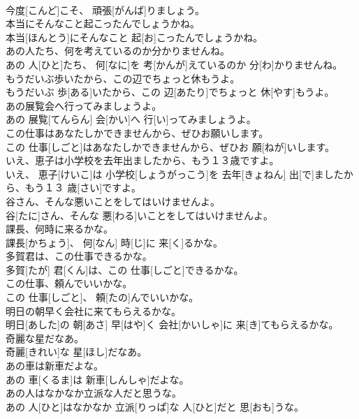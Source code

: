 \documentclass[8pt]{extreport}
\begin{document}
\begin{CJK}{UTF8}{min}
\\	今度[こんど]こそ、 頑張[がんば]りましょう。	
\\	本当にそんなこと起こったんでしょうかね。	
\\	本当[ほんとう]にそんなこと 起[お]こったんでしょうかね。	
\\	あの人たち、何を考えているのか分かりませんね。	
\\	あの 人[ひと]たち、 何[なに]を 考[かんが]えているのか 分[わ]かりませんね。	
\\	もうだいぶ歩いたから、この辺でちょっと休もうよ。	
\\	もうだいぶ 歩[ある]いたから、この 辺[あたり]でちょっと 休[やす]もうよ。	
\\	あの展覧会へ行ってみましょうよ。	
\\	あの 展覧[てんらん] 会[かい]へ 行[い]ってみましょうよ。	
\\	この仕事はあなたしかできませんから、ぜひお願いします。	
\\	この 仕事[しごと]はあなたしかできませんから、ぜひお 願[ねが]いします。	
\\	いえ、恵子は小学校を去年出ましたから、もう１３歳ですよ。	
\\	いえ、 恵子[けいこ]は 小学校[しょうがっこう]を 去年[きょねん] 出[で]ましたから、もう１３ 歳[さい]ですよ。	
\\	谷さん、そんな悪いことをしてはいけませんよ。	
\\	谷[たに]さん、そんな 悪[わる]いことをしてはいけませんよ。	
\\	課長、何時に来るかな。	
\\	課長[かちょう]、 何[なん] 時[じ]に 来[く]るかな。	
\\	多賀君は、この仕事できるかな。	
\\	多賀[たが] 君[くん]は、この 仕事[しごと]できるかな。	
\\	この仕事、頼んでいいかな。	
\\	この 仕事[しごと]、 頼[たの]んでいいかな。	
\\	明日の朝早く会社に来てもらえるかな。	
\\	明日[あした]の 朝[あさ] 早[はや]く 会社[かいしゃ]に 来[き]てもらえるかな。	
\\	奇麗な星だなあ。	
\\	奇麗[きれい]な 星[ほし]だなあ。	
\\	あの車は新車だよな。	
\\	あの 車[くるま]は 新車[しんしゃ]だよな。	
\\	あの人はなかなか立派な人だと思うな。	
\\	あの 人[ひと]はなかなか 立派[りっぱ]な 人[ひと]だと 思[おも]うな。	

\end{CJK}
\end{document}
